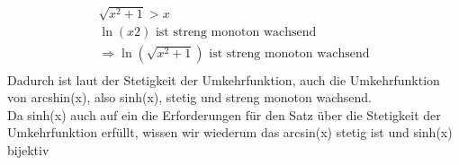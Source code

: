 \documentclass{HM}
\begin{document}
\begin{enumerate}
\begin{enumerate}
	\begin{align*}
		\sqrt{x^2+1} > x\\
		\ln(x2) \text{ ist streng monoton wachsend}\\
		\Rightarrow \ln(\sqrt{x^2+1})\text{ ist streng monoton wachsend}\\
	\end{align*}
		Dadurch ist laut der Stetigkeit der Umkehrfunktion, auch die Umkehrfunktion von arcshin(x), also sinh(x), stetig und streng monoton wachsend.\\
		Da sinh(x) auch auf ein die Erforderungen für den Satz über die Stetigkeit der Umkehrfunktion erfüllt, wissen wir wiederum das arcsin(x) stetig ist und sinh(x) bijektiv\\
	
\end{enumerate}


\end{enumerate}
\end{document}
